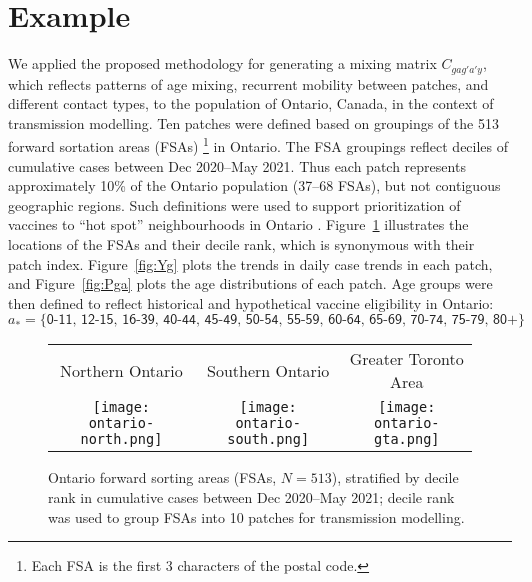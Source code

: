 \section{Example}\label{ex}
We applied the proposed methodology for generating a mixing matrix $C_{gag'a'y}$,
which reflects patterns of age mixing, recurrent mobility between patches, and different contact types,
to the population of Ontario, Canada, in the context of \covid transmission modelling.
Ten patches were defined based on groupings of the 513 forward sortation areas (FSAs)%
\footnote{Each FSA is the first 3 characters of the postal code.} in Ontario.
The FSA groupings reflect deciles of cumulative \covid cases between Dec 2020--May 2021.
Thus each patch represents approximately 10\% of the Ontario population (\mbox{37--68} FSAs),
but not contiguous geographic regions.
Such definitions were used to support prioritization of \covid vaccines
to ``hot spot'' neighbourhoods in Ontario \cite{Mishra2021}.
Figure~\ref{fig:map} illustrates the locations of the FSAs and their decile rank,
which is synonymous with their patch index.
Figure~\ref{fig:Yg} plots the trends in daily \covid case trends in each patch, and
Figure~\ref{fig:Pga} plots the age distributions of each patch.
Age groups were then defined to reflect historical and hypothetical \covid vaccine eligibility in Ontario:
\begin{equation}
  a_* = \big\{\textsf{0-11, 12-15, 16-39, 40-44, 45-49, 50-54, 55-59, 60-64, 65-69, 70-74, 75-79, 80+}\big\}
\end{equation}
\begin{figure}
  \centering
  \setlength{\tabcolsep}{0pt}
  \begin{tabular}{ccc}
    Northern Ontario & Southern Ontario & Greater Toronto Area\\
    \texttt{[image: ontario-north.png]} &
    \texttt{[image: ontario-south.png]} &
    \texttt{[image: ontario-gta.png]}
  \end{tabular}
  \caption{Ontario forward sorting areas (FSAs, $N=513$),
    stratified by decile rank in cumulative \covid cases between Dec 2020--May 2021;
    decile rank was used to group FSAs into 10 patches for transmission modelling.}
  \label{fig:map}
\end{figure}
